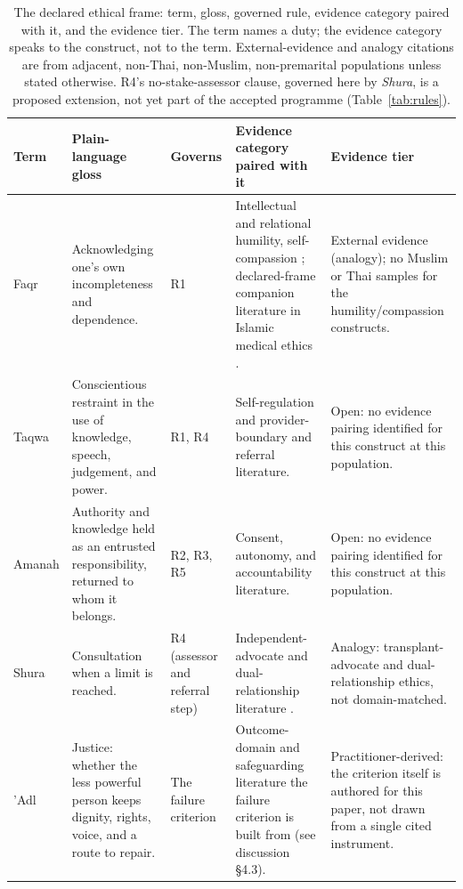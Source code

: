 \begin{table}[t]
\centering\footnotesize
\caption{The declared ethical frame: term, gloss, governed rule, evidence category paired with it, and
the evidence tier. The term names a duty; the evidence category speaks to the construct, not to the
term. External-evidence and analogy citations are from adjacent, non-Thai, non-Muslim, non-premarital
populations unless stated otherwise. R4's no-stake-assessor clause, governed here by \emph{Shura},
is a proposed extension, not yet part of the accepted programme (Table~\ref{tab:rules}).}
\label{tab:ethic}
\begin{tabularx}{\textwidth}{@{}p{1.4cm}YYYp{1.7cm}@{}}
\toprule
\textbf{Term} & \textbf{Plain-language gloss} & \textbf{Governs} & \textbf{Evidence category paired with it} & \textbf{Evidence tier}\\
\midrule
Faqr & Acknowledging one's own incompleteness and dependence. & R1 & Intellectual and relational
humility, self-compassion \cite{ref209,ref211,ref212,ref213}; declared-frame companion literature in
Islamic medical ethics \cite{ref226,ref228}. & External evidence (analogy); no Muslim or Thai samples
for the humility\slash compassion constructs.\\
Taqwa & Conscientious restraint in the use of knowledge, speech, judgement, and power. & R1, R4 &
Self-regulation and provider-boundary and referral literature. & Open: no evidence pairing identified
for this construct at this population.\\
Amanah & Authority and knowledge held as an entrusted responsibility, returned to whom it belongs. &
R2, R3, R5 & Consent, autonomy, and accountability literature. & Open: no evidence pairing identified
for this construct at this population.\\
Shura & Consultation when a limit is reached. & R4 (assessor and referral step) & Independent-advocate
and dual-relationship literature \cite{ref158,ref159,ref162,ref163}. & Analogy: transplant-advocate and
dual-relationship ethics, not domain-matched.\\
'Adl & Justice: whether the less powerful person keeps dignity, rights, voice, and a route to
repair. & The failure criterion & Outcome-domain and safeguarding literature the failure criterion is
built from (see discussion \S4.3). & Practitioner-derived: the criterion itself is authored for this
paper, not drawn from a single cited instrument.\\
\bottomrule
\end{tabularx}
\end{table}

